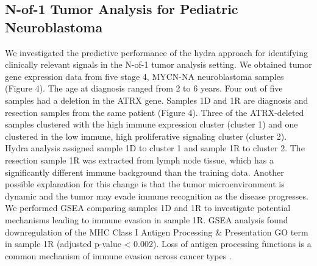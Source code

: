 \documentclass[10pt,letterpaper]{article}
\begin{document}
\subsection{N-of-1 Tumor Analysis for Pediatric Neuroblastoma}
We investigated the predictive performance of the hydra approach for identifying clinically relevant signals in the N-of-1 tumor analysis setting. We obtained tumor gene expression data from five stage 4, MYCN-NA neuroblastoma samples (Figure 4). The age at diagnosis ranged from 2 to 6 years. Four out of five samples had a deletion in the ATRX gene. Samples 1D and 1R are diagnosis and resection samples from the same patient (Figure 4). Three of the ATRX-deleted samples clustered with the high immune expression cluster (cluster 1) and one clustered in the low immune, high proliferative signaling cluster (cluster 2). Hydra analysis assigned sample 1D to cluster 1 and sample 1R to cluster 2. The resection sample 1R was extracted from lymph node tissue, which has a significantly different immune background than the training data. Another possible explanation for this change is that the tumor microenvironment is dynamic and the tumor may evade immune recognition as the disease progresses. We performed GSEA comparing samples 1D and 1R to investigate potential mechanisms leading to immune evasion in sample 1R. GSEA analysis found downregulation of the MHC Class I Antigen Processing \& Presentation GO term in sample 1R (adjusted p-value < 0.002). Loss of antigen processing functions is a common mechanism of immune evasion across cancer types \cite{reevesAntigenProcessingImmune2017}.
\end{document}

